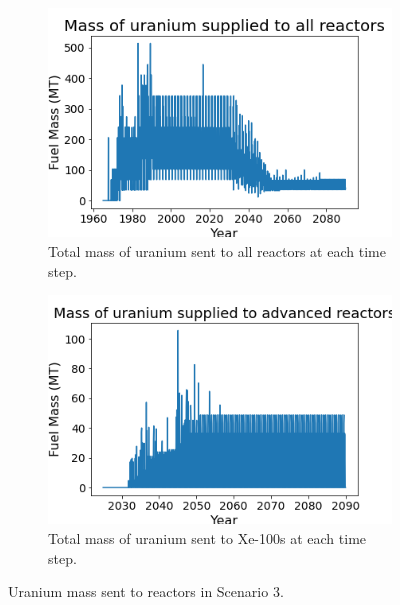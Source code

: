 \begin{figure}
    \centering
    \begin{subfigure}{0.4\textwidth}
        \centering
        \includegraphics[scale=0.3]{figures/fuelsupply_scenarios_3.png}
        \caption{Total mass of uranium sent to all reactors at each time step.}
        \label{fig:totalfuel_3}
    \end{subfigure}
    \begin{subfigure}{0.4\textwidth}
        \centering
        \includegraphics[scale=0.3]{figures/advancedRX_fuelsupply_scenarios_3.png}
        \caption{Total mass of uranium sent to Xe-100s at each time step.}
        \label{fig:haleu_3}
    \end{subfigure}
    \caption{Uranium mass sent to reactors in Scenario 3.}
    \label{fig:fuel_3}
\end{figure}


